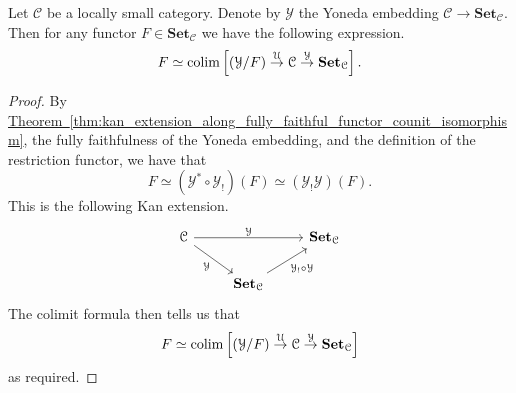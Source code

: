 \documentclass[main.tex]{subfiles}
\begin{document}
\begin{lemma}
  \label{lemma:colimit_of_comma_category}
  Let $\mathcal{C}$ be a locally small category. Denote by $\mathcal{Y}$ the Yoneda embedding $\mathcal{C} \to \mathbf{Set}_{\mathcal{C}}$. Then for any functor $F\in \mathbf{Set}_{\mathcal{C}}$ we have the following expression.
  \begin{equation*}
    F \simeq \operatorname*{colim} \left[ (\mathcal{Y} / F) \overset{\mathcal{U}}{\to} \mathcal{C} \overset{\mathcal{Y}}{\to} \mathbf{Set}_{\mathcal{C}} \right].
  \end{equation*}
\end{lemma}
\begin{proof}
  By \hyperref[thm:kan_extension_along_fully_faithful_functor_counit_isomorphism]{Theorem~\ref*{thm:kan_extension_along_fully_faithful_functor_counit_isomorphism}}, the fully faithfulness of the Yoneda embedding, and the definition of the restriction functor, we have that
  \begin{equation*}
    F \simeq (\mathcal{Y}^{*} \circ \mathcal{Y}_{!})(F) \simeq (\mathcal{Y}_{!}\mathcal{Y})(F).
  \end{equation*}
  This is the following Kan extension.
  \begin{equation*}
    \begin{tikzcd}
      \mathcal{C}
      \arrow[rr, "\mathcal{Y}"]
      \arrow[dr, swap, "\mathcal{Y}"]
      && \mathbf{Set}_{\mathcal{C}}
      \\
      & \mathbf{Set}_{\mathcal{C}}
      \arrow[ur, swap, "\mathcal{Y}_{!} \circ \mathcal{Y}"]
    \end{tikzcd}
  \end{equation*}
  The colimit formula then tells us that
  \begin{equation*}
    F \simeq \operatorname*{colim} \left[ (\mathcal{Y}/F) \overset{\mathcal{U}}{\to} \mathcal{C} \overset{\mathcal{Y}}{\to} \mathbf{Set}_{\mathcal{C}} \right]
  \end{equation*}
  as required.

\end{proof}
\end{document}
